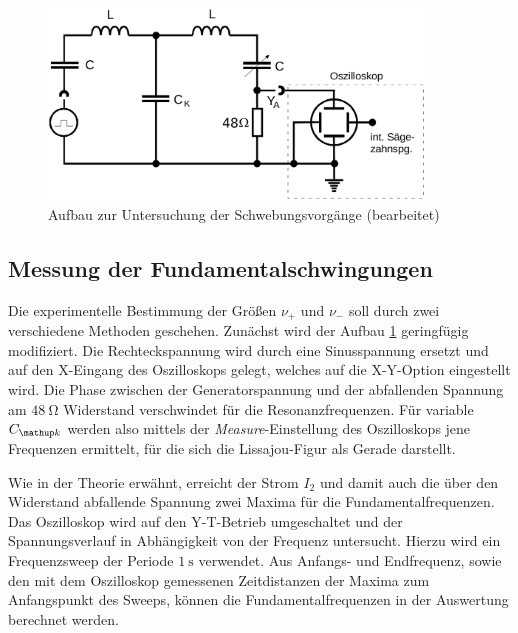 \begin{figure}
  \centering
  \includegraphics[width = 10cm]{pics/aufbau_schwebung.png}
  \caption{Aufbau zur Untersuchung der Schwebungsvorgänge \cite{anleitung355} (bearbeitet)}
  \label{fig: schwebung}
\end{figure}

\subsection{Messung der Fundamentalschwingungen}
Die experimentelle Bestimmung der Größen $\nu_+$ und $\nu_-$ soll durch zwei verschiedene Methoden geschehen. Zunächst wird der Aufbau \ref{fig: schwebung}
geringfügig modifiziert. Die Rechteckspannung wird durch eine Sinusspannung ersetzt und auf den X-Eingang des Oszilloskops gelegt, welches auf die X-Y-Option
eingestellt wird. Die Phase zwischen der Generatorspannung und der abfallenden Spannung am $\SI{48}{\ohm}$ Widerstand verschwindet für die Resonanzfrequenzen.
Für variable $C\ua{k}$ werden also mittels der \emph{Measure}-Einstellung des Oszilloskops jene Frequenzen ermittelt, für die sich die Lissajou-Figur als Gerade darstellt.\par %
Wie in der Theorie erwähnt, erreicht der Strom $I_2$ und damit auch die über den Widerstand abfallende Spannung zwei Maxima für die Fundamentalfrequenzen.
Das Oszilloskop wird auf den Y-T-Betrieb umgeschaltet und der Spannungsverlauf in Abhängigkeit von der Frequenz untersucht. Hierzu wird ein Frequenzsweep
der Periode $\SI{1}{\second}$ verwendet. Aus Anfangs- und Endfrequenz, sowie den mit dem Oszilloskop gemessenen Zeitdistanzen der Maxima zum Anfangspunkt
des Sweeps, können die Fundamentalfrequenzen in der Auswertung berechnet werden.
\newpage
